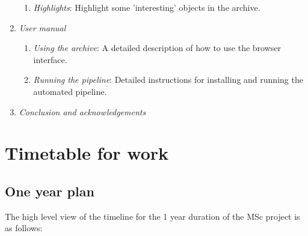 \documentclass[a4paper,10pt]{article}
\begin{document}
\begin{enumerate}
\begin{enumerate}
	      \item \emph{Highlights}: Highlight some 'interesting' objects in the archive. 
	\end{enumerate}
	\item \emph{User manual}
	\begin{enumerate}
	      \item \emph{Using the archive}: A detailed description of how to use the browser interface. 
	      \item \emph{Running the pipeline}: Detailed instructions for installing and running the automated pipeline.  
	\end{enumerate}
	\item \emph{Conclusion and acknowledgements}
\end{enumerate}      



\section{Timetable for work}

\subsection{One year plan} 
The high level view of the timeline for the 1 year duration of the MSc project is as follows:
\end{document}
